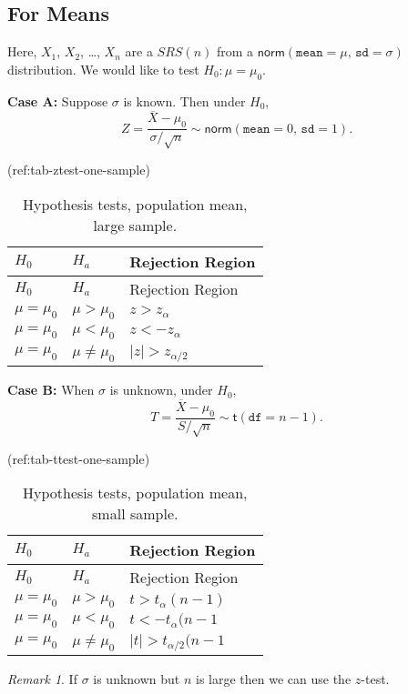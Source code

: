 \documentclass[]{book}
\numberwithin{equation}{chapter}
\numberwithin{figure}{chapter}
\theoremstyle{plain}
\theoremstyle{definition}
\theoremstyle{remark}
\theoremstyle{definition}
\theoremstyle{definition}
\theoremstyle{remark}
\newtheorem*{remark}{Remark}
\begin{document}
\subsection{For Means}\label{for-means}

Here, \(X_{1}\), \(X_{2}\), \ldots{}, \(X_{n}\) are a \(SRS(n)\) from a
\(\mathsf{norm}(\mathtt{mean} = \mu,\,\mathtt{sd} = \sigma)\)
distribution. We would like to test \(H_{0}:\mu = \mu_{0}\).

\textbf{Case A:} Suppose \(\sigma\) is known. Then under \(H_{0}\), \[
   Z = \frac{\overline{X} - \mu_{0}}{\sigma/\sqrt{n}} \sim \mathsf{norm}(\mathtt{mean} = 0,\,\mathtt{sd} = 1).
   \]

(ref:tab-ztest-one-sample)

\begin{longtable}[]{@{}lll@{}}
\caption{Hypothesis tests, population mean, large
sample.}\tabularnewline
\toprule
\(H_{0}\) & \(H_{a}\) & Rejection Region\tabularnewline
\midrule
\endfirsthead
\toprule
\(H_{0}\) & \(H_{a}\) & Rejection Region\tabularnewline
\midrule
\endhead
\(\mu = \mu_{0}\) & \(\mu > \mu_{0}\) &
\(z > z_{\alpha}\)\tabularnewline
\(\mu = \mu_{0}\) & \(\mu < \mu_{0}\) &
\(z < -z_{\alpha}\)\tabularnewline
\(\mu = \mu_{0}\) & \(\mu \neq \mu_{0}\) &
\(\vert z \vert > z_{\alpha/2}\)\tabularnewline
\bottomrule
\end{longtable}

\textbf{Case B:} When \(\sigma\) is unknown, under \(H_{0}\), \[
   T = \frac{\overline{X} - \mu_{0}}{S/\sqrt{n}} \sim \mathsf{t}(\mathtt{df} = n - 1).
   \]

(ref:tab-ttest-one-sample)

\begin{longtable}[]{@{}lll@{}}
\caption{Hypothesis tests, population mean, small
sample.}\tabularnewline
\toprule
\(H_{0}\) & \(H_{a}\) & Rejection Region\tabularnewline
\midrule
\endfirsthead
\toprule
\(H_{0}\) & \(H_{a}\) & Rejection Region\tabularnewline
\midrule
\endhead
\(\mu = \mu_{0}\) & \(\mu > \mu_{0}\) &
\(t > t_{\alpha}(n - 1)\)\tabularnewline
\(\mu = \mu_{0}\) & \(\mu < \mu_{0}\) &
\(t < -t_{\alpha}(n - 1\)\tabularnewline
\(\mu = \mu_{0}\) & \(\mu \neq \mu_{0}\) &
\(\vert t \vert > t_{\alpha/2}(n - 1\)\tabularnewline
\bottomrule
\end{longtable}

\begin{remark}
If \(\sigma\) is unknown but \(n\) is large then we can use the
\(z\)-test.
\end{remark}
\end{document}
